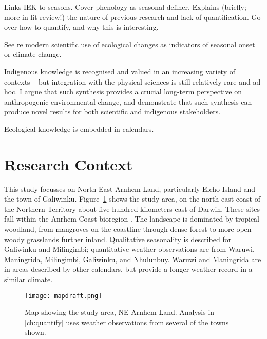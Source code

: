 Links IEK to seasons.  Cover phenology as seasonal definer.
Explains (briefly; more in lit review!) the nature of previous research
and lack of quantification.  Go over how to quantify, and why
this is interesting.


See \citet{menzel2006} re modern scientific use of ecological changes
as indicators of seasonal onset or climate change.


Indigenous knowledge is recognised and valued in an increasing variety
of contexts \citep[eg.][]{petheram2010,cochran2015,berkes2012} –
but integration with the physical sciences is still relatively rare and ad-hoc.
%
I argue that such synthesis provides a crucial long-term perspective on
anthropogenic environmental change, and demonstrate that such synthesis
can produce novel results for both scientific and indigenous stakeholders.

Ecological knowledge is embedded in calendars.




\section{Research Context}
\label{sec:context}

This study focusses on North-East Arnhem Land, particularly Elcho Island
and the town of Galiwinku.  Figure~\ref{fig:arnhem-map} shows the study
area, on the north-east coast of the Northern Territory about five hundred
kilometers east of Darwin.
%
These sites fall within the Anrhem Coast bioregion \citep{ens2014}.
The landscape is dominated by tropical woodland, from mangroves on the coastline
through dense forest to more open woody grasslands further inland.
%
Qualitative seasonality is described for Galiwinku and Milingimbi;
quantitative weather observations are from Waruwi, Maningrida, Milingimbi,
Galiwinku, and Nhulunbuy.  Waruwi and Maningrida are in areas described by
other calendars, but provide a longer weather record in a similar climate.

\begin{figure}[h]
    \centering
    \texttt{[image: mapdraft.png]}
    \caption[Map showing the study area, NE Arnhem Land]{
        Map showing the study area, NE Arnhem Land.
        Analysis in \autoref{ch:quantify} uses weather observations from several of the towns shown.
        }
    \label{fig:arnhem-map}
\end{figure}

